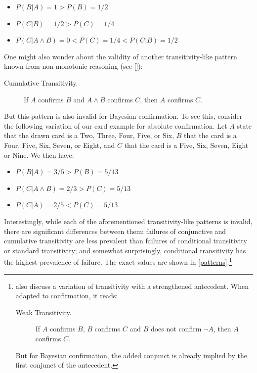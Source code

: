 \documentclass[a4paper,11pt]{article}
\begin{document}
\begin{itemize}
\item $P(B|A)=1>P(B)=1/2$
\item $P(C|B)=1/2>P(C)=1/4$ 
\item $P(C|A\land B)=0<P(C)=1/4<P(C|B)=1/2$
\end{itemize}


\noindent One might also wonder about the validity of another transitivity-like pattern known from non-monotonic reasoning (see \citeauthor{Kraus1990} [\citeyear{Kraus1990}]):

\begin{description}
\item[Cumulative Transitivity.] If $A$ confirms $B$ and $A\land B$ confirms $C$, then $A$ confirms \nolinebreak  $C$.%
\end{description}

\noindent But this pattern is also invalid for Bayesian confirmation. To see this, consider the following variation of our card example for absolute confirmation. Let $A$ state that the drawn card is a Two, Three, Four, Five, or Six, $B$ that the card is a Four, Five, Six, Seven, or Eight, and $C$ that the card is a Five, Six, Seven, Eight or Nine. We then have:

\begin{itemize}
\item $P(B|A)=3/5>P(B)=5/13$
\item $P(C|A\land B)=2/3>P(C)=5/13$ 
\item $P(C|A)=2/5<P(C)=5/13$
\end{itemize}

\noindent Interestingly, while each of the aforementioned transitivity-like patterns is invalid, there are significant differences between them: failures of conjunctive and cumulative transitivity are less prevalent than failures of conditional transitivity or standard transitivity; and somewhat surprisingly, conditional transitivity has the highest prevalence of failure. The exact values are shown in  \autoref{patterns}.\footnote{\cite{Freund1991} also discuss a variation of transitivity with a strengthened antecedent. When adapted to confirmation, it reads: 

\begin{description}
\item[Weak Transitivity.] If $A$ confirms $B$, $B$ confirms $C$ and $B$ does not confirm $\neg A$, then $A$ confirms $C$.
\end{description}

\noindent But for Bayesian confirmation, the added conjunct is already implied by the first conjunct of the antecedent.} 
\end{document}
